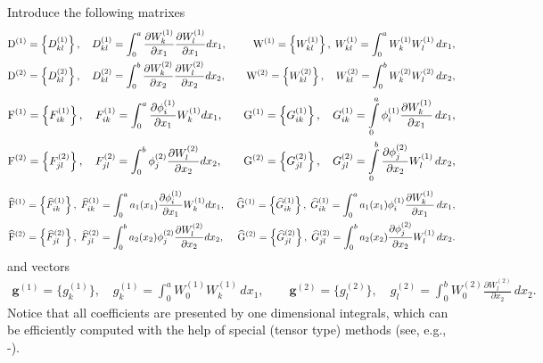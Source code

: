 \documentclass[amstex,amstext,amsfonts,epsf,12pt] {amsart}
\newcommand\be{\begin{eqnarray*}}
\newcommand\ee{\end{eqnarray*}}
\def\be{\begin{eqnarray*}}
\def\ee{\end{eqnarray*}}
\def\wh{\widehat}
\def\phix{\phi^{(1)}}
\def\phiy{\phi^{(2)}}
\def\Wx{W^{(1)}}
\def\Wy{W^{(2)}}
\def\bg{\boldsymbol g}
\begin{document}
 Introduce the following matrixes 
 \be
&{\rm D}^{(1)}=\left\{D^{(1)}_{kl}\right\}
,\quad D^{(1)}_{kl}=\displaystyle\int^a_0\frac{\partial\Wx_k}{\partial x_1}
\frac{\partial\Wx_l}{\partial x_1}dx_1,\quad &{\rm W}^{(1)}=
\left\{W^{(1)}_{kl}\right\},\;
W^{(1)}_{kl}=\int^a_0 \Wx_k\Wx_l\,dx_1,\\
&{\rm D}^{(2)}=\left\{D^{(2)}_{kl}\right\}
,\quad D^{(2)}_{kl}=\displaystyle\int^b_0\frac{\partial\Wy_k}{\partial x_2}
\frac{\partial\Wy_l}{\partial x_2}dx_2,\quad &{\rm W}^{(2)}=
\left\{W^{(2)}_{kl}\right\},\quad
W^{(2)}_{kl}=\int^b_0 \Wy_k\Wy_l\,dx_2,
\ee
\be
&{\rm F}^{(1)}=\left\{F^{(1)}_{ik}\right\}
,\quad F^{(1)}_{ik}=\displaystyle\int^a_0\frac{\partial\phix_i}{\partial x_1}
\Wx_k dx_1,\quad &{\rm G}^{(1)}=
\left\{G^{(1)}_{ik}\right\},\quad
G^{(1)}_{ik}=
\int\limits^a_0 \phix_i\frac{\partial\Wx_k}{\partial x_1}\,dx_1,\\
&{\rm F}^{(2)}=\left\{F^{(2)}_{jl}\right\}
,\quad F^{(2)}_{jl}=\displaystyle\int^b_0\phiy_j\frac{\partial\Wy_l}{\partial x_2}
 dx_2,\quad &{\rm G}^{(2)}=
\left\{G^{(2)}_{jl}\right\},\quad
G^{(2)}_{jl}=
\int\limits^b_0 \frac{\partial\phiy_j}{\partial x_2}\Wx_l\,dx_2,
\ee
\be
&\wh{\rm F}^{(1)}=\left\{\wh F^{(1)}_{ik}\right\},\; \wh F^{(1)}_{ik}=\displaystyle\int^a_0a_1(x_1)\frac{\partial\phix_i}{\partial x_1}
\Wx_k dx_1,\; &\wh{\rm G}^{(1)}=
\left\{\wh G^{(1)}_{ik}\right\},\;
\wh G^{(1)}_{ik}=
\int^a_0 a_1(x_1) \phix_i\frac{\partial\Wx_k}{\partial x_1}\,dx_1,\\
&\wh{\rm F}^{(2)}=\left\{\wh F^{(2)}_{jl}\right\},\; \wh F^{(2)}_{jl}=\displaystyle\int^b_0a_2(x_2)\phiy_j\frac{\partial\Wy_l}{\partial x_2}
 dx_2,\; &\wh{\rm G}^{(2)}=
\left\{\wh G^{(2)}_{jl}\right\},\;
\wh G^{(2)}_{jl}=
\int^b_0a_2(x_2) \frac{\partial\phiy_j}{\partial x_2}\Wx_l\,dx_2.
\ee
and vectors
\be
\bg^{(1)}=\{g^{(1)}_k\},\quad g^{(1)}_k=\displaystyle\int^a_0 \Wx_0\Wx_k\,dx_1,\qquad
\bg^{(2)}=\{g^{(2)}_l\},\quad g^{(2)}_l=
\displaystyle\int^b_0 \Wy_0\frac{\partial\Wy_l}{\partial x_2}\,dx_2.
\ee
Notice that all  coefficients are presented
by one dimensional integrals, which can be efficiently computed
with the help of special (tensor type) methods (see, e.g.,
\cite{KhQuant:09}-\cite{KhSautVeit:11}).
\end{document}

